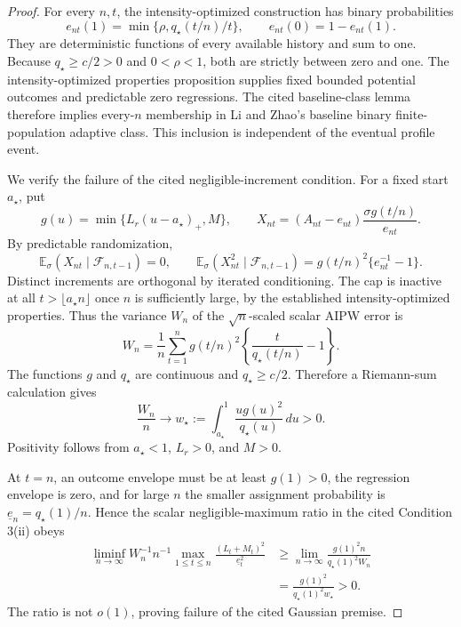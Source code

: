 \documentclass{article}
\begin{document}
\begin{proof}
For every \(n,t\), the intensity-optimized construction has binary probabilities
\[
 e_{nt}(1)=\min\{\rho,q_\star(t/n)/t\},
 \qquad
 e_{nt}(0)=1-e_{nt}(1).
\]
They are deterministic functions of every available history and sum to one.  Because \(q_\star\ge c/2>0\) and \(0<\rho<1\), both are strictly between zero and one.  The intensity-optimized properties proposition supplies fixed bounded potential outcomes and predictable zero regressions.  The cited baseline-class lemma therefore implies every-\(n\) membership in Li and Zhao's baseline binary finite-population adaptive class.  This inclusion is independent of the eventual profile event.

We verify the failure of the cited negligible-increment condition.  For a fixed start \(a_\star\), put
\[
 g(u)=\min\{L_r(u-a_\star)_+,M\},
 \qquad
 X_{nt}=(A_{nt}-e_{nt})\frac{\sigma g(t/n)}{e_{nt}}.
\]
By predictable randomization,
\[
 \mathbb E_\sigma(X_{nt}\mid\mathcal F_{n,t-1})=0,
 \qquad
 \mathbb E_\sigma(X_{nt}^2\mid\mathcal F_{n,t-1})
 =g(t/n)^2\{e_{nt}^{-1}-1\}.
\]
Distinct increments are orthogonal by iterated conditioning.  The cap is inactive at all \(t>\lfloor a_\star n\rfloor\) once \(n\) is sufficiently large, by the established intensity-optimized properties.  Thus the variance \(W_n\) of the \(\sqrt n\)-scaled scalar AIPW error is
\[
 W_n=\frac1n\sum_{t=1}^n
 g(t/n)^2\left\{\frac{t}{q_\star(t/n)}-1\right\}.
\]
The functions \(g\) and \(q_\star\) are continuous and \(q_\star\ge c/2\).  Therefore a Riemann-sum calculation gives
\[
 \frac{W_n}{n}\longrightarrow
 w_\star:=\int_{a_\star}^1
 \frac{u g(u)^2}{q_\star(u)}\,du>0.
\]
Positivity follows from \(a_\star<1\), \(L_r>0\), and \(M>0\).

At \(t=n\), an outcome envelope must be at least \(g(1)>0\), the regression envelope is zero, and for large \(n\) the smaller assignment probability is \(\underline e_n=q_\star(1)/n\).  Hence the scalar negligible-maximum ratio in the cited Condition 3(ii) obeys
\[
\begin{aligned}
 \liminf_{n\to\infty}
 W_n^{-1}n^{-1}
 \max_{1\le t\le n}\frac{(L_t+M_t)^2}{\underline e_t^2}
 &\ge
 \lim_{n\to\infty}
 \frac{g(1)^2n}{q_\star(1)^2W_n}\\
 &=\frac{g(1)^2}{q_\star(1)^2w_\star}>0.
\end{aligned}
\]
The ratio is not \(o(1)\), proving failure of the cited Gaussian premise.


\end{proof}
\end{document}
